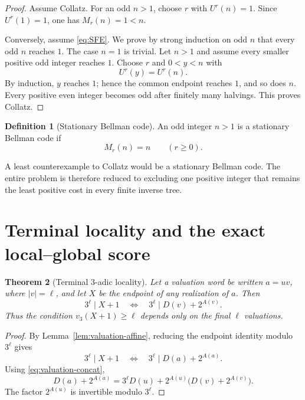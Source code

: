 \documentclass[11pt,reqno]{amsart}
\numberwithin{equation}{section}
\newtheorem{theorem}{Theorem}[section]
\theoremstyle{definition}
\newtheorem{definition}[theorem]{Definition}
\theoremstyle{remark}
\newcommand{\vthree}{v_3}
\begin{document}
\begin{proof}
Assume Collatz.  For an odd $n>1$, choose $r$ with $U^r(n)=1$.  Since
$U^r(1)=1$, one has $M_r(n)=1<n$.

Conversely, assume \eqref{eq:SFE}.  We prove by strong induction on odd $n$
that every odd $n$ reaches $1$.  The case $n=1$ is trivial.  Let $n>1$ and
assume every smaller positive odd integer reaches $1$.  Choose $r$ and
$0<y<n$ with
\[
U^r(y)=U^r(n).
\]
By induction, $y$ reaches $1$; hence the common endpoint reaches $1$, and so
does $n$.  Every positive even integer becomes odd after finitely many
halvings.  This proves Collatz.
\end{proof}

\begin{definition}[Stationary Bellman code]
An odd integer $n>1$ is a stationary Bellman code if
\begin{equation}\label{eq:stationary-Bellman}
M_r(n)=n
\qquad(r\ge0).
\end{equation}
\end{definition}

A least counterexample to Collatz would be a stationary Bellman code.  The
entire problem is therefore reduced to excluding one positive integer that
remains the least positive cost in every finite inverse tree.

\section{Terminal locality and the exact local--global score}\label{sec:local-global}

\begin{theorem}[Terminal $3$-adic locality]\label{thm:terminal-locality}
Let a valuation word be written $a=uv$, where $|v|=\ell$, and let $X$ be the
endpoint of any realization of $a$.  Then
\begin{equation}\label{eq:terminal-locality}
3^\ell\mid X+1
\quad\Longleftrightarrow\quad
3^\ell\mid D(v)+2^{A(v)}.
\end{equation}
Thus the condition $\vthree(X+1)\ge\ell$ depends only on the final $\ell$
valuations.
\end{theorem}

\begin{proof}
By Lemma~\ref{lem:valuation-affine}, reducing the endpoint identity modulo
$3^\ell$ gives
\[
3^\ell\mid X+1
\quad\Longleftrightarrow\quad
3^\ell\mid D(a)+2^{A(a)}.
\]
Using \eqref{eq:valuation-concat},
\[
D(a)+2^{A(a)}
=
3^\ell D(u)+2^{A(u)}\bigl(D(v)+2^{A(v)}\bigr).
\]
The factor $2^{A(u)}$ is invertible modulo $3^\ell$.
\end{proof}
\end{document}
